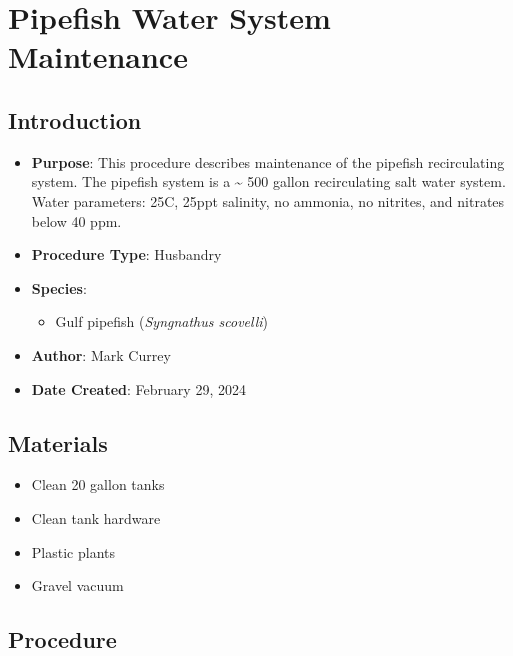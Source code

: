 \documentclass[
  letterpaper,
  DIV=11,
  numbers=noendperiod]{scrreprt}
\providecommand{\tightlist}{%
  \setlength{\itemsep}{0pt}\setlength{\parskip}{0pt}}\usepackage{longtable,booktabs,array}
\begin{document}
\hypertarget{sec-husbandry_pipefish_tank_maint}{%
\chapter{Pipefish Water System
Maintenance}\label{sec-husbandry_pipefish_tank_maint}}

\hypertarget{introduction-58}{%
\section{Introduction}\label{introduction-58}}

\begin{itemize}
\tightlist
\item
  \textbf{Purpose}: This procedure describes maintenance of the pipefish
  recirculating system. The pipefish system is a \textasciitilde{} 500
  gallon recirculating salt water system. Water parameters: 25C, 25ppt
  salinity, no ammonia, no nitrites, and nitrates below 40 ppm.
\item
  \textbf{Procedure Type}: Husbandry
\item
  \textbf{Species}:

  \begin{itemize}
  \tightlist
  \item
    Gulf pipefish (\emph{Syngnathus scovelli})
  \end{itemize}
\item
  \textbf{Author}: Mark Currey\\
\item
  \textbf{Date Created}: February 29, 2024
\end{itemize}

\hypertarget{materials-56}{%
\section{Materials}\label{materials-56}}

\begin{itemize}
\tightlist
\item
  Clean 20 gallon tanks
\item
  Clean tank hardware
\item
  Plastic plants
\item
  Gravel vacuum
\end{itemize}

\hypertarget{procedure-56}{%
\section{Procedure}\label{procedure-56}}
\end{document}

